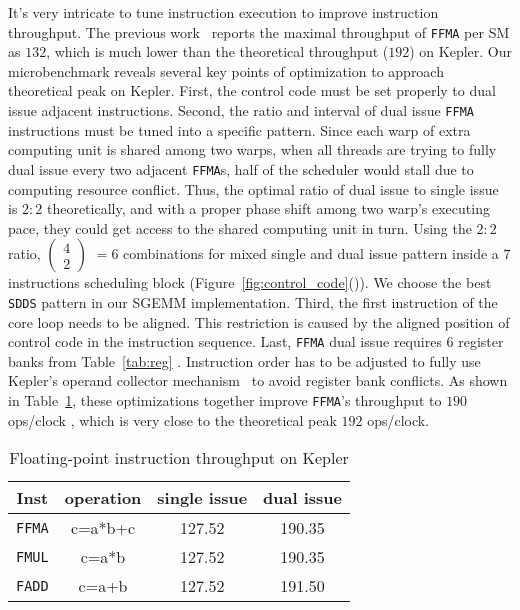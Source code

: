 It's very intricate to tune instruction execution to improve instruction throughput. The previous work~\cite{lai} 
reports the maximal throughput of {\tt FFMA} per SM as $132$, which is much lower than the theoretical throughput ($192$) on Kepler. 
Our microbenchmark reveals several key points of optimization to approach theoretical peak on Kepler. 
First, the control code must be set properly to dual issue adjacent instructions. Second, the ratio and interval of 
dual issue {\tt FFMA} instructions must be tuned into a specific pattern. 
Since each warp of extra computing unit is 
shared among two warps,  when all threads are trying to fully dual issue every two adjacent {\tt FFMA}s, half of the 
scheduler would stall due to computing resource conflict. 
Thus, the optimal ratio of dual issue to single issue is $2:2$ theoretically, and 
with a proper phase shift among two warp's executing pace, they could get access to the shared computing unit in turn. 
Using the $2:2$ ratio, \( \begin{pmatrix} 4 \\ 2 \end{pmatrix} \) $=6$ combinations for mixed single  and dual issue pattern inside a $7$ instructions scheduling block (Figure~\ref{fig:control_code}()). 
We choose the best {\tt SDDS} pattern in our SGEMM implementation. 
Third, the first instruction of the core loop needs to be aligned. This restriction is 
caused by the aligned position of control code in the instruction sequence. 
Last, {\tt FFMA} dual issue requires $6$ register banks from Table~\ref{tab:reg} . 
Instruction order has to be adjusted to fully use Kepler's operand 
collector mechanism~\cite{collector,tarjan2012policy} to avoid register bank conflicts.
As shown in 
Table~\ref{tab:ffma}, these optimizations together improve {\tt FFMA}'s throughput to $190$ ops/clock , which is very close to the theoretical peak $192$ ops/clock.

\begin{table}[htbp]
\caption{Floating-point instruction throughput on Kepler}
\centering
\scalebox{1.} {
\begin{tabular}{|c||c|c|c|}
\hline
Inst &operation&single issue&dual issue\\
\hline
{\tt FFMA} &c=a*b+c&127.52&190.35 \\
\hline
{\tt FMUL} &c=a*b&127.52&190.35 \\
\hline
{\tt FADD} &c=a+b&127.52&191.50\\
\hline
\end{tabular}
}
\label{tab:ffma}
\end{table}


